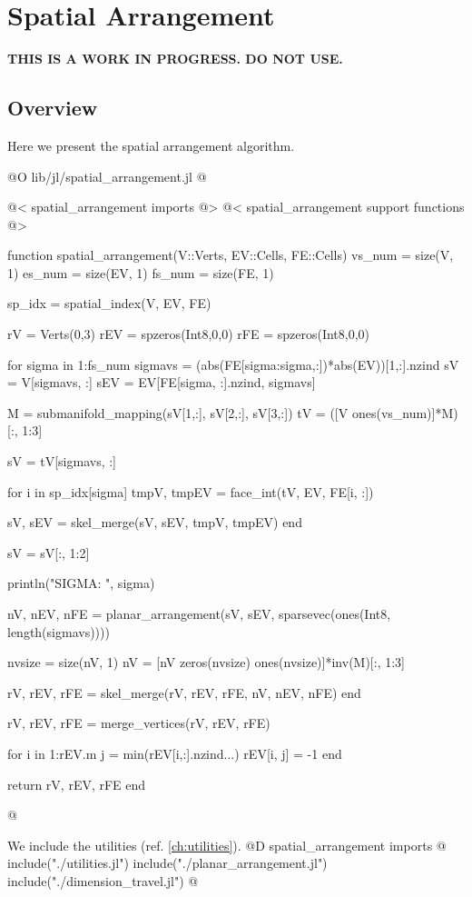 \chapter{Spatial Arrangement}

\textbf{THIS IS A WORK IN PROGRESS. DO NOT USE.}

\section{Overview}
Here we present the spatial arrangement algorithm. 

@O lib/jl/spatial_arrangement.jl
@{@< spatial\_arrangement imports @>
@< spatial\_arrangement support functions @>

function spatial_arrangement(V::Verts, EV::Cells, FE::Cells)
    vs_num = size(V, 1)
    es_num = size(EV, 1)
    fs_num = size(FE, 1)

    sp_idx = spatial_index(V, EV, FE)

    rV = Verts(0,3)
    rEV = spzeros(Int8,0,0)
    rFE = spzeros(Int8,0,0)

    for sigma in 1:fs_num
        sigmavs = (abs(FE[sigma:sigma,:])*abs(EV))[1,:].nzind 
        sV = V[sigmavs, :]
        sEV = EV[FE[sigma, :].nzind, sigmavs]


        M = submanifold_mapping(sV[1,:], sV[2,:], sV[3,:])
        tV = ([V ones(vs_num)]*M)[:, 1:3]

        sV = tV[sigmavs, :]

        for i in sp_idx[sigma]
            tmpV, tmpEV = face_int(tV, EV, FE[i, :])
            
            sV, sEV = skel_merge(sV, sEV, tmpV, tmpEV)
        end

        sV = sV[:, 1:2]

        println("SIGMA: ", sigma)
        
        nV, nEV, nFE = planar_arrangement(sV, sEV, sparsevec(ones(Int8, length(sigmavs))))

        nvsize = size(nV, 1)
        nV = [nV zeros(nvsize) ones(nvsize)]*inv(M)[:, 1:3]

        rV, rEV, rFE = skel_merge(rV, rEV, rFE, nV, nEV, nFE)
    end

    rV, rEV, rFE = merge_vertices(rV, rEV, rFE)
    
    for i in 1:rEV.m
        j = min(rEV[i,:].nzind...)
        rEV[i, j] = -1
    end

    return rV, rEV, rFE
end


@}
We include the utilities (ref. \ref{ch:utilities}).
@D spatial\_arrangement imports
@{
include("./utilities.jl")
include("./planar_arrangement.jl")
include("./dimension_travel.jl")
@}





